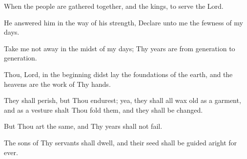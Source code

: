 When the people are gathered together, and the kings, to serve the Lord.

He answered him in the way of his strength, Declare unto me the fewness of my days.

Take me not away in the midst of my days; Thy years are from generation to generation.

Thou, Lord, in the beginning didst lay the foundations of the earth, and the heavens are the work of Thy hands.

They shall perish, but Thou endurest; yea, they shall all wax old as a garment, and as a vesture shalt Thou fold them, and they
shall be changed.

But Thou art the same, and Thy years shall not fail.

The sons of Thy servants shall dwell, and their seed shall be guided aright for ever.
